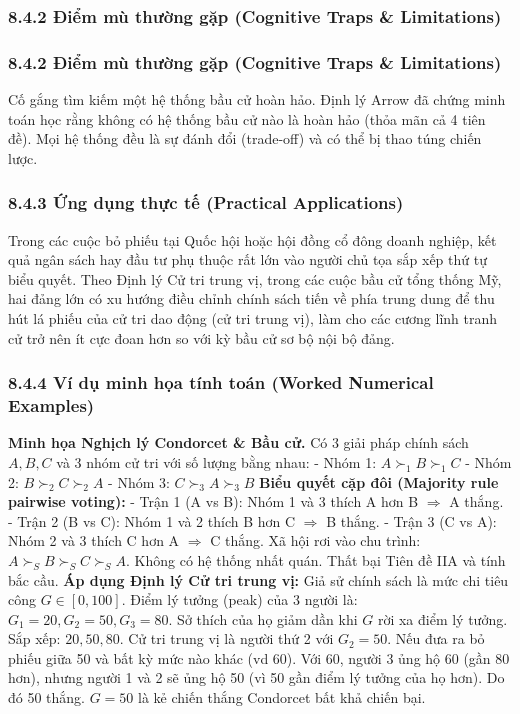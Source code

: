 \documentclass[
]{article}
\begin{document}
\subsubsection{8.4.2 Điểm mù thường gặp (Cognitive Traps \&
Limitations)}\label{ux111iux1ec3m-muxf9-thux1b0ux1eddng-gux1eb7p-cognitive-traps-limitations-58}

\subsubsection{8.4.2 Điểm mù thường gặp (Cognitive Traps \&
Limitations)}\label{ux111iux1ec3m-muxf9-thux1b0ux1eddng-gux1eb7p-cognitive-traps-limitations-59}

Cố gắng tìm kiếm một hệ thống bầu cử hoàn hảo. Định lý Arrow đã chứng
minh toán học rằng không có hệ thống bầu cử nào là hoàn hảo (thỏa mãn cả
4 tiên đề). Mọi hệ thống đều là sự đánh đổi (trade-off) và có thể bị
thao túng chiến lược.

\subsubsection{8.4.3 Ứng dụng thực tế (Practical
Applications)}\label{ux1ee9ng-dux1ee5ng-thux1ef1c-tux1ebf-practical-applications-29}

Trong các cuộc bỏ phiếu tại Quốc hội hoặc hội đồng cổ đông doanh nghiệp,
kết quả ngân sách hay đầu tư phụ thuộc rất lớn vào người chủ tọa sắp xếp
thứ tự biểu quyết. Theo Định lý Cử tri trung vị, trong các cuộc bầu cử
tổng thống Mỹ, hai đảng lớn có xu hướng điều chỉnh chính sách tiến về
phía trung dung để thu hút lá phiếu của cử tri dao động (cử tri trung
vị), làm cho các cương lĩnh tranh cử trở nên ít cực đoan hơn so với kỳ
bầu cử sơ bộ nội bộ đảng.

\subsubsection{8.4.4 Ví dụ minh họa tính toán (Worked Numerical
Examples)}\label{vuxed-dux1ee5-minh-hux1ecda-tuxednh-touxe1n-worked-numerical-examples-28}

\textbf{Minh họa Nghịch lý Condorcet \& Bầu cử.} Có 3 giải pháp chính
sách \(A, B, C\) và 3 nhóm cử tri với số lượng bằng nhau: - Nhóm 1:
\(A \succ_1 B \succ_1 C\) - Nhóm 2: \(B \succ_2 C \succ_2 A\) - Nhóm 3:
\(C \succ_3 A \succ_3 B\) \textbf{Biểu quyết cặp đôi (Majority rule
pairwise voting):} - Trận 1 (A vs B): Nhóm 1 và 3 thích A hơn B
\(\Rightarrow\) A thắng. - Trận 2 (B vs C): Nhóm 1 và 2 thích B hơn C
\(\Rightarrow\) B thắng. - Trận 3 (C vs A): Nhóm 2 và 3 thích C hơn A
\(\Rightarrow\) C thắng. Xã hội rơi vào chu trình:
\(A \succ_S B \succ_S C \succ_S A\). Không có hệ thống nhất quán. Thất
bại Tiên đề IIA và tính bắc cầu. \textbf{Áp dụng Định lý Cử tri trung
vị:} Giả sử chính sách là mức chi tiêu công \(G \in [0, 100]\). Điểm lý
tưởng (peak) của 3 người là: \(G_1 = 20, G_2 = 50, G_3 = 80\). Sở thích
của họ giảm dần khi \(G\) rời xa điểm lý tưởng. Sắp xếp: \(20, 50, 80\).
Cử tri trung vị là người thứ 2 với \(G_2 = 50\). Nếu đưa ra bỏ phiếu
giữa 50 và bất kỳ mức nào khác (vd 60). Với 60, người 3 ủng hộ 60 (gần
80 hơn), nhưng người 1 và 2 sẽ ủng hộ 50 (vì 50 gần điểm lý tưởng của họ
hơn). Do đó 50 thắng. \(G=50\) là kẻ chiến thắng Condorcet bất khả chiến
bại.
\end{document}
